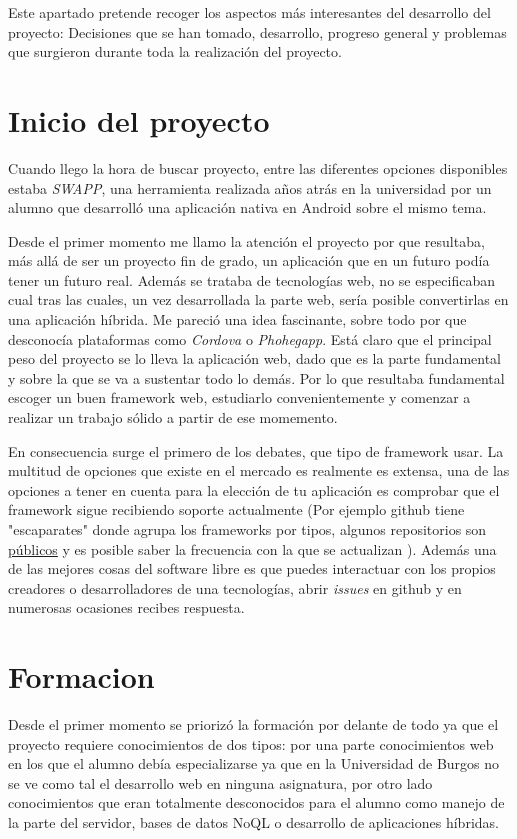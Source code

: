 
Este apartado pretende recoger los aspectos más interesantes del desarrollo del proyecto: Decisiones que se han tomado, desarrollo, progreso general y problemas que surgieron durante toda la realización del proyecto.


\section{Inicio del proyecto}\label{inicio-proyecto}
Cuando llego la hora de buscar proyecto, entre las  diferentes opciones disponibles estaba \emph{SWAPP}, una herramienta realizada años atrás en la universidad por un alumno que desarrolló una aplicación nativa en Android sobre el mismo tema.

 Desde el primer momento me llamo la atención el proyecto por que resultaba, más allá de ser un proyecto fin de grado, un aplicación que en un futuro podía tener un futuro real. Además se trataba de tecnologías web, no se especificaban cual tras las cuales, un vez desarrollada la parte web, sería posible convertirlas en una aplicación híbrida. Me pareció una idea fascinante, sobre todo por que desconocía plataformas como \emph{Cordova} o \emph{Phohegapp}. Está claro que el principal peso del proyecto se lo lleva la aplicación web, dado que es la parte fundamental y sobre la que se va a sustentar todo lo demás. Por lo que resultaba fundamental escoger un buen framework web, estudiarlo convenientemente y comenzar a realizar un trabajo sólido a partir de ese momemento.
 
  En consecuencia surge el primero de los debates, que tipo de framework usar. La multitud de opciones que existe en el mercado es realmente es extensa, una de las opciones a tener en cuenta para la elección de tu aplicación es comprobar que el framework sigue recibiendo soporte actualmente (Por ejemplo github tiene "escaparates" donde agrupa los frameworks por tipos, algunos repositorios son \hyperlink{ https://github.com/showcases/web-application-frameworks/}{públicos}  y es posible saber la frecuencia con la que se actualizan ). Además una de las mejores cosas del software libre es que puedes interactuar con los propios creadores  o desarrolladores de una tecnologías, abrir \emph{issues} en github y en numerosas ocasiones recibes respuesta. 
  
  
\section{Formacion}\label{formacion}
Desde el primer momento se priorizó la formación por delante de todo ya que el proyecto requiere conocimientos de dos tipos: por una parte conocimientos web en los que el alumno debía especializarse ya que en la Universidad de Burgos no se ve como tal el desarrollo web en ninguna asignatura, por otro lado conocimientos que eran totalmente desconocidos para el alumno como manejo de la parte del servidor, bases de datos NoQL o desarrollo de aplicaciones híbridas. 

